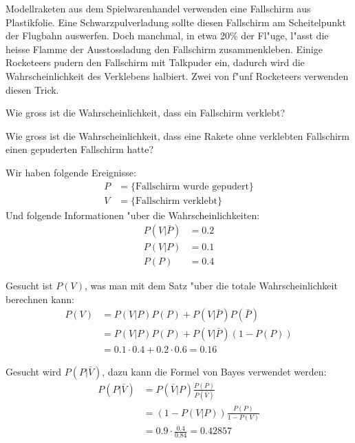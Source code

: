 Modellraketen aus dem Spielwarenhandel verwenden eine Fallschirm aus
Plastikfolie. Eine Schwarzpulverladung sollte diesen Fallschirm am
Scheitelpunkt der Flugbahn auswerfen. Doch manchmal, in etwa 20\%
der Fl"uge, l"asst die heisse
Flamme der Ausstossladung den Fallschirm zusammenkleben. Einige
Rocketeers pudern den Fallschirm mit Talkpuder ein, dadurch wird
die Wahrscheinlichkeit des Verklebens halbiert.
Zwei von f"unf Rocketeers verwenden diesen Trick.
\begin{teilaufgaben}
\item Wie gross ist die Wahrscheinlichkeit, dass ein Fallschirm
verklebt?
\item Wie gross ist die Wahrscheinlichkeit, dass eine Rakete
ohne verklebten Fallschirm einen gepuderten Fallschirm hatte?
\end{teilaufgaben}

\begin{loesung}
Wir haben folgende Ereignisse:
\begin{align*}
P&=\{\text{Fallschirm wurde gepudert}\}\\
V&=\{\text{Fallschirm verklebt}\}
\end{align*}
Und folgende Informationen "uber die Wahrscheinlichkeiten:
\begin{align*}
P(V|\bar P)&=0.2\\
P(V|P)&=0.1\\
P(P)&=0.4
\end{align*}
\begin{teilaufgaben}
\item Gesucht ist $P(V)$, was man mit dem Satz "uber die totale
Wahrscheinlichkeit berechnen kann:
\begin{align*}
P(V)&=P(V|P)P(P)+P(V|\bar P)P(\bar P)\\
&=P(V|P)P(P)+P(V|\bar P)(1-P(P))\\
&=0.1\cdot 0.4+0.2\cdot 0.6=0.16
\end{align*}
\item Gesucht wird $P(P|\bar V)$, dazu kann die Formel von Bayes verwendet
werden:
\begin{align*}
P(P|\bar V)
&=
P(\bar V |P)\frac{P(P)}{P(\bar V)}
\\
&=(1-P(V|P))\frac{P(P)}{1-P(V)}\\
&=
0.9 \cdot\frac{0.4}{0.84}=0.42857
\end{align*}
\end{teilaufgaben}
\end{loesung}
